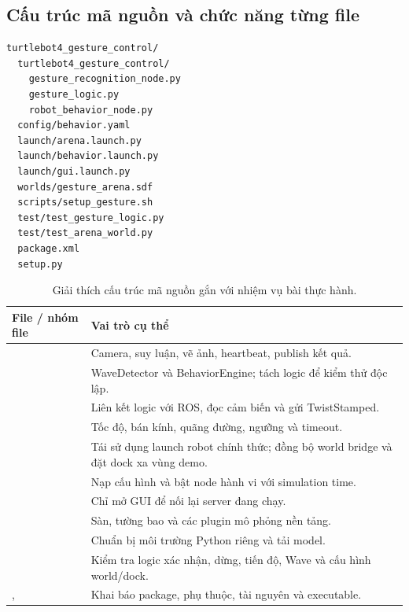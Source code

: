 \documentclass[12pt,a4paper]{article}
\newcommand{\smalltable}{\small\setlength{\tabcolsep}{4pt}\renewcommand{\arraystretch}{1.12}}
\begin{document}
\subsection{Cấu trúc mã nguồn và chức năng từng file}
\begin{lstlisting}[caption={Cấu trúc package ứng dụng, lược bỏ các file build và cache.}]
turtlebot4_gesture_control/
  turtlebot4_gesture_control/
    gesture_recognition_node.py
    gesture_logic.py
    robot_behavior_node.py
  config/behavior.yaml
  launch/arena.launch.py
  launch/behavior.launch.py
  launch/gui.launch.py
  worlds/gesture_arena.sdf
  scripts/setup_gesture.sh
  test/test_gesture_logic.py
  test/test_arena_world.py
  package.xml
  setup.py
\end{lstlisting}
\begin{table}[!htbp]\centering\smalltable
\begin{tabularx}{\linewidth}{@{}p{6.1cm}L@{}}\toprule
\textbf{File / nhóm file} & \textbf{Vai trò cụ thể}\\\midrule
{} & Camera, suy luận, vẽ ảnh, heartbeat, publish kết quả.\\
 & WaveDetector và BehaviorEngine; tách logic để kiểm thử độc lập.\\
 & Liên kết logic với ROS, đọc cảm biến và gửi TwistStamped.\\
 & Tốc độ, bán kính, quãng đường, ngưỡng và timeout.\\
 & Tái sử dụng launch robot chính thức; đồng bộ world bridge và đặt dock xa vùng demo.\\
 & Nạp cấu hình và bật node hành vi với simulation time.\\
 & Chỉ mở GUI để nối lại server đang chạy.\\
 & Sàn, tường bao và các plugin mô phỏng nền tảng.\\
 & Chuẩn bị môi trường Python riêng và tải model.\\
 & Kiểm tra logic xác nhận, dừng, tiến độ, Wave và cấu hình world/dock.\\
,  & Khai báo package, phụ thuộc, tài nguyên và executable.\\\bottomrule
\end{tabularx}
\caption{Giải thích cấu trúc mã nguồn gắn với nhiệm vụ bài thực hành.}
\end{table}
\end{document}
